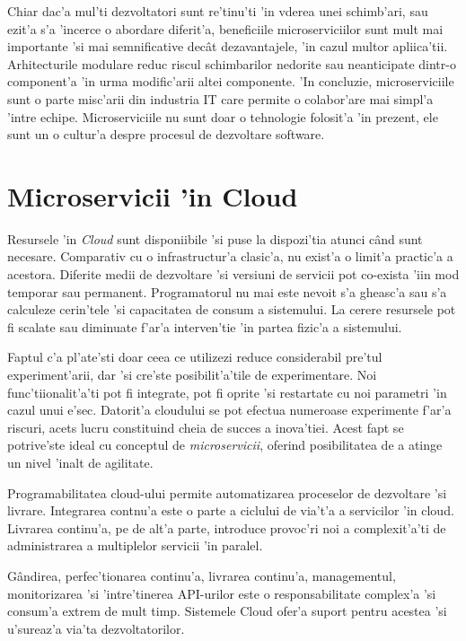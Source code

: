 \documentclass[12pt,a4paper,twoside]{report}
\begin{document}
Chiar dac'a mul'ti dezvoltatori sunt re'tinu'ti 'in vderea unei schimb'ari, sau ezit'a s'a 'incerce o abordare diferit'a, beneficiile microserviciilor sunt mult mai importante 'si mai semnificative decât dezavantajele, 'in cazul multor apliica'tii\cite{art_microservices}.
Arhitecturile modulare reduc riscul schimbarilor nedorite sau neanticipate dintr-o component'a 'in urma modific'arii altei componente. 'In concluzie, microserviciile sunt o parte misc'arii din industria IT care permite o colabor'are mai simpl'a 'intre echipe. Microserviciile nu sunt doar o tehnologie folosit'a 'in prezent, ele sunt un o cultur'a despre procesul de dezvoltare software.

\section{Microservicii 'in Cloud}

Resursele 'in \textit{Cloud} sunt disponiibile 'si puse la dispozi'tia atunci când sunt necesare. Comparativ cu o infrastructur'a clasic'a, nu exist'a o limit'a practic'a a acestora.
Diferite medii de dezvoltare 'si versiuni de servicii pot co-exista 'iin mod temporar sau permanent. Programatorul nu mai este nevoit s'a gheasc'a sau s'a calculeze cerin'tele 'si capacitatea de consum a sistemului. La cerere resursele pot fi scalate sau diminuate f'ar'a interven'tie 'in partea fizic'a a sistemului.

Faptul c'a pl'ate'sti doar ceea ce utilizezi reduce considerabil pre'tul experiment'arii, dar 'si cre'ste posibilit'a'tile de experimentare. Noi func'tiionalit'a'ti pot fi integrate, pot fi oprite 'si restartate cu noi parametri 'in cazul unui e'sec. Datorit'a cloudului se pot efectua numeroase experimente f'ar'a riscuri, acets lucru constituind cheia de succes a inova'tiei. Acest fapt se potrive'ste ideal cu conceptul de \textit{microservicii}, oferind posibilitatea de a atinge un nivel 'inalt de agilitate.

Programabilitatea cloud-ului permite automatizarea proceselor de dezvoltare 'si livrare.
Integrarea contnu'a este o parte a ciclului de via't'a a servicilor 'in cloud. Livrarea continu'a, pe de alt'a parte, introduce provoc'ri noi a complexit'a'ti de administrarea a multiplelor servicii 'in paralel.

Gândirea, perfec'tionarea continu'a, livrarea continu'a, managementul, monitorizarea 'si 'intre'tinerea API-urilor este o responsabilitate complex'a 'si consum'a extrem de mult timp. Sistemele Cloud ofer'a suport pentru acestea 'si u'sureaz'a via'ta dezvoltatorilor.
\end{document}
